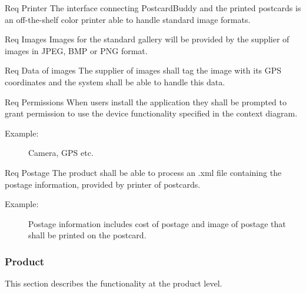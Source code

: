 \documentclass[10pt,a4paper]{article}
\begin{document}
\begin {description}
	\item [Req \thesubsubsection {.\theinterf} Printer] The interface connecting PostcardBuddy and the printed postcards is an off-the-shelf color printer able to handle standard image formats.

	\item [Req \thesubsubsection {.\theinterf} Images] Images for the standard gallery will be provided by the supplier of images in JPEG, BMP or PNG format.

	\item [Req \thesubsubsection {.\theinterf} Data of images] The supplier of images shall tag the image with its GPS coordinates and the system shall be able to handle this data.

	\item [Req \thesubsubsection {.\theinterf} Permissions] When users install the application they shall be prompted to grant permission to use the device functionality specified in the context diagram.  
	\begin{description}
\item[Example:] Camera, GPS etc.
	\end{description} 
	\item [Req \thesubsubsection {.\theinterf} Postage] The product shall be able to process an .xml file containing the postage information, provided by printer of postcards.
	\begin{description}
	\item[Example:] Postage information includes cost of postage and image of postage that shall be printed on the postcard.
	\end{description}	 
\end{description}

\subsubsection{Product} \label{ssec:product}
This section describes the functionality at the product level. 

\newcommand{\rprod}[1]{\refstepcounter{product}\label{#1}}
\end{document}
